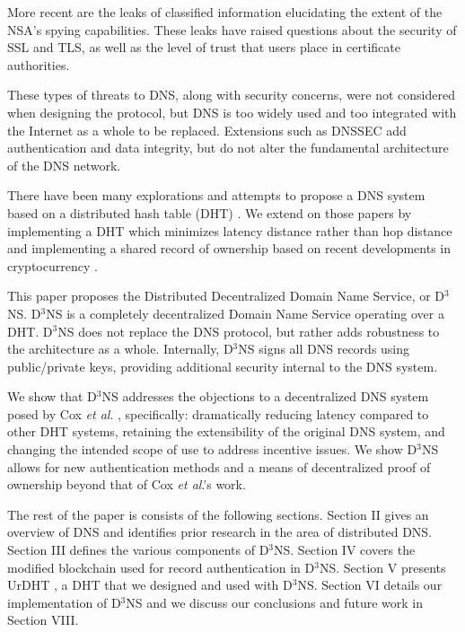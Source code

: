 \documentclass[11pt]{IEEEtran} %
\begin{document}
More recent are the leaks of classified information elucidating the extent of the NSA's spying capabilities. These leaks have raised questions about the security of SSL and TLS, as well as the level of trust that users place in certificate authorities.


These types of threats to DNS, along with security concerns, were not considered when designing the protocol, but DNS is too widely used and too integrated with the Internet as a whole to be replaced. Extensions such as DNSSEC \cite{blacka2013clarifications} add authentication and data integrity, but do not alter the fundamental architecture of the DNS network.


There have been many explorations and attempts \cite{cox} \cite{pappas} \cite{ramasubramanian2004design} to propose a DNS system based on a distributed hash table (DHT) \cite{chord}. We extend on those papers by implementing a DHT which minimizes latency distance rather than hop distance and implementing a shared record of ownership based on recent developments in cryptocurrency \cite{namecoin} \cite{bitcoin}.


This paper proposes the Distributed Decentralized Domain Name Service, or D$^{3}$NS.  D$^{3}$NS is a completely decentralized Domain Name Service operating over a DHT.  D$^{3}$NS does not replace the DNS protocol, but rather adds robustness to the architecture as a whole.  Internally, D$^3$NS signs all DNS records using public/private keys, providing additional security internal to the DNS system.

We show that D$^{3}$NS addresses the objections to a decentralized DNS system posed by Cox \textit{et al}. \cite{cox}, specifically: dramatically reducing latency compared to other DHT systems, retaining the extensibility of the original DNS system, and changing the intended scope of use to address incentive issues. We show D$^{3}$NS allows for new authentication methods and a means of decentralized proof of ownership beyond that of Cox \textit{et al}.'s work. 


The rest of the paper is consists of the following sections.  Section II gives an overview of DNS and identifies prior research in the area of distributed DNS.  Section III defines the various components of D$^3$NS.  Section IV covers the modified blockchain used for record authentication in D$^3$NS.  Section V presents UrDHT \cite{urdht}, a DHT that we designed and used with D$^3$NS.  Section VI details our implementation of D$^3$NS and  we discuss our conclusions and future work in Section VIII.
\end{document}
